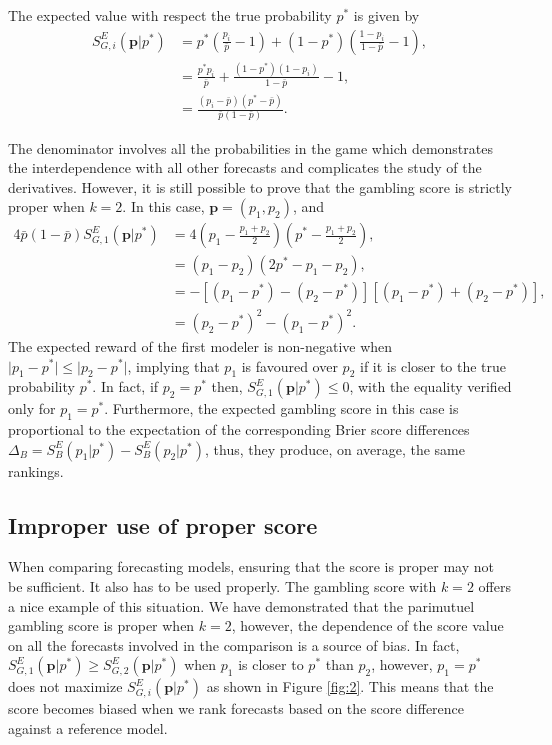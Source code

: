 \documentclass[referee,sn-basic]{sn-jnl}
\theoremstyle{thmstyleone}%
\theoremstyle{thmstyletwo}%
\theoremstyle{thmstylethree}%
\begin{document}
The expected value with respect the true probability $p^*$ is given by
\begin{align}
S_{G,i}^E(\mathbf p\vert  p^*)  & = p^* \left( \frac{p_i}{\bar p} -1 \right) + (1 - p^*) \left( \frac{1-p_i}{1-\bar p} - 1 \right), \nonumber\\
& = \frac{p^*p_i}{\bar p} + \frac{(1 - p^*)(1 - p_i)}{1 - \bar p} - 1, \nonumber \\
& = \frac{(p_i - \bar p)\left( p^* - \bar p \right)}{\bar p(1 - \bar p)} .
\label{eq:exp_parimutuel}
\end{align}

The denominator involves all the probabilities in the game which demonstrates the interdependence with all other forecasts and complicates the study of the derivatives. However, it is still possible to prove that the gambling score is strictly proper when $k = 2$. In this case, $\mathbf p = (p_1,p_2)$, and
$$
\begin{aligned}
4 \bar p(1-\bar p) S_{G,1}^E(\mathbf p\vert  p^*) &=
4 \left(p_1 - \frac{p_1+p_2}{2}\right)\left( p^* - \frac{p_1+p_2}{2}\right),
\\
&= (p_1-p_2)\left( 2p^* - p_1-p_2\right), \\
&= -\left[(p_1-p^*)-(p_2-p^*)\right]\left[ (p_1-p^*)+(p_2-p^*)\right], \\
&= (p_2-p^*)^2 - (p_1-p^*)^2 .
\end{aligned}
$$
The expected reward of the first modeler is non-negative when $\vert p_1-p^*\vert \leq\vert p_2-p^*\vert $, implying that $p_1$ is favoured over $p_2$ if it is closer to the true probability $p^*$. In fact, if $p_2 = p^*$ then, $S_{G,1}^E(\mathbf p\vert p^*) \leq 0$, with the equality verified only for $p_1 = p^*$. Furthermore, the expected gambling score in this case is proportional to the expectation of the corresponding Brier score differences $\Delta_B=S_B^E(p_1\vert p^*)-S_B^E(p_2\vert p^*)$, thus, they produce, on average, the same rankings. 

\subsection{Improper use of proper score}

When comparing forecasting models, ensuring that the score is proper may not be sufficient. It also has to be used properly. The gambling score with $k = 2$ offers a nice example of this situation. We have demonstrated that the parimutuel gambling score is proper when $k = 2$, however, the dependence of the score value on all the forecasts involved in the comparison is a source of bias. In fact, $S_{G,1}^E(\mathbf p\vert  p^*) \geq S_{G,2}^E(\mathbf p\vert  p^*)$ when $p_1$ is closer to $p^*$ than $p_2$, however, $p_1 = p^*$ does not maximize $S_{G,i}^E(\mathbf p\vert  p^*)$ as shown in Figure \ref{fig:2}. This means that the score becomes biased when we rank forecasts based on the score difference against a reference model. 
\end{document}
